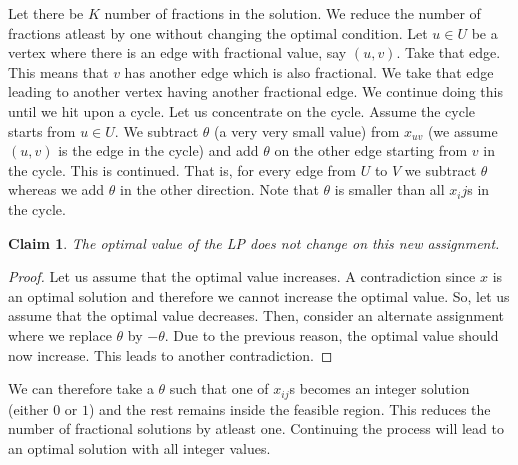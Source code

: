\documentclass[12pt,
    driverfallback=dvipdfm,
 	openany,
    a4paper,
    toc=bibliography,
    twoside,
    numbers=noenddot]{book}              %
\newtheorem{claim}[theorem]{Claim}
\begin{document}
Let there be $K$ number of fractions in the solution. We reduce the number of fractions atleast by one without changing the optimal condition. Let $u \in U$ be a vertex where there is an edge with fractional value, say $(u,v)$. Take that edge. This means that $v$ has another edge which is also fractional. We take that edge leading to another vertex having another fractional edge. We continue doing this until we hit upon a cycle. Let us concentrate on the cycle. Assume the cycle starts from $u \in U$. We subtract $\theta$ (a very very small value) from $x_{uv}$ (we assume $(u,v)$ is the edge in the cycle) and add $\theta$ on the other edge starting from $v$ in the cycle.  This is continued. That is, for every edge from $U$ to $V$ we subtract $\theta$ whereas we add $\theta$ in the other direction. Note that $\theta$ is smaller than all $x_ij$s in the cycle.

\begin{claim}
The optimal value of the LP does not change on this new assignment.
\end{claim}
\begin{proof}
Let us assume that the optimal value increases. A contradiction since $x$ is an optimal solution and therefore we cannot increase the optimal value. So, let us assume that the optimal value decreases. Then, consider an alternate assignment where we replace $\theta$ by $-\theta$. Due to the previous reason, the optimal value should now increase. This leads to another contradiction.
\end{proof}

We can therefore take a $\theta$ such that one of $x_{ij}$s becomes an integer solution (either $0$ or $1$) and the rest remains inside the feasible region. This reduces the number of fractional solutions by atleast one. Continuing the process will lead to an optimal solution with all integer values.


%
%
\end{document}

